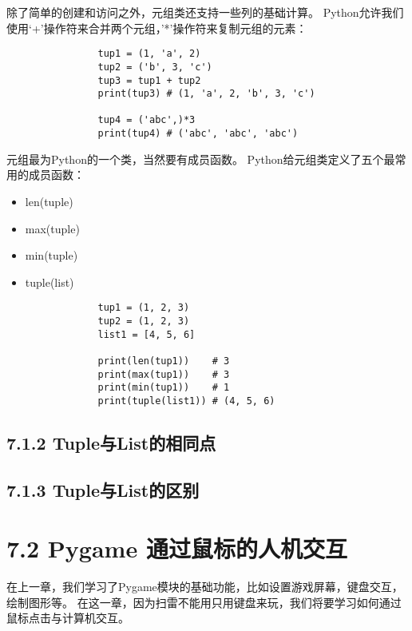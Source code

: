 \documentclass[12pt]{article}
\begin{document}
            除了简单的创建和访问之外，元组类还支持一些列的基础计算。
            Python允许我们使用‘+’操作符来合并两个元组，'*'操作符来复制元组的元素：
            \begin{lstlisting}
                tup1 = (1, 'a', 2)
                tup2 = ('b', 3, 'c')
                tup3 = tup1 + tup2
                print(tup3) # (1, 'a', 2, 'b', 3, 'c')

                tup4 = ('abc',)*3
                print(tup4) # ('abc', 'abc', 'abc')
            \end{lstlisting}

            元组最为Python的一个类，当然要有成员函数。
            Python给元组类定义了五个最常用的成员函数：
            \begin{itemize}
                \item len(tuple)
                \item max(tuple)
                \item min(tuple)
                \item tuple(list)
            \end{itemize}
            \begin{lstlisting}
                tup1 = (1, 2, 3)
                tup2 = (1, 2, 3)
                list1 = [4, 5, 6]
                
                print(len(tup1))    # 3
                print(max(tup1))    # 3
                print(min(tup1))    # 1
                print(tuple(list1)) # (4, 5, 6)
            \end{lstlisting}

        \subsection*{7.1.2 Tuple与List的相同点}


        \subsection*{7.1.3 Tuple与List的区别}





    
    \section*{7.2 Pygame 通过鼠标的人机交互}
        在上一章，我们学习了Pygame模块的基础功能，比如设置游戏屏幕，键盘交互，绘制图形等。
        在这一章，因为扫雷不能用只用键盘来玩，我们将要学习如何通过鼠标点击与计算机交互。
\end{document}
